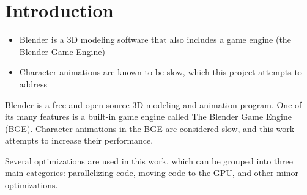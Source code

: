 \section{Introduction}
\ifsummaries
\begin{itemize}
 \item Blender is a 3D modeling software that also includes a game engine (the Blender Game Engine)
 \item Character animations are known to be slow, which this project attempts to address
\end{itemize}
\fi

Blender is a free and open-source 3D modeling and animation program\cite{blender}.
One of its many features is a built-in game engine called The Blender Game Engine (BGE).
Character animations in the BGE are considered slow, and this work attempts to increase their performance.

Several optimizations are used in this work, which can be grouped into three main categories: parallelizing code, moving code to the GPU, and other minor optimizations.
